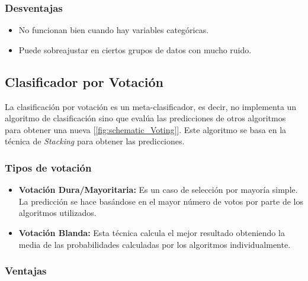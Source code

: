 \subsubsection{Desventajas}

\begin{itemize}
    \item No funcionan bien cuando hay variables categóricas.
    \item Puede sobreajustar en ciertos grupos de datos con mucho ruido.
\end{itemize}





\subsection[Clasificador por Votación]{Clasificador por Votación~\cite{ruta2005classifier}}
\label{sec:voting_clf}

La clasificación por votación es un meta-clasificador, es decir, no implementa un algoritmo de clasificación sino que evalúa las predicciones de otros algoritmos para obtener una nueva [\cref{fig:schematic_Voting}]. Este algoritmo se basa en la técnica de \textit{Stacking} para obtener las predicciones.

\subsubsection{Tipos de votación}

\begin{itemize}
    \item \textbf{Votación Dura/Mayoritaria:} Es un caso de selección por mayoría simple. La predicción se hace basándose en el mayor número de votos por parte de los algoritmos utilizados.

    \item \textbf{Votación Blanda:} Esta técnica calcula el mejor resultado obteniendo la media de las probabilidades calculadas por los algoritmos individualmente.
\end{itemize}

\subsubsection{Ventajas}

